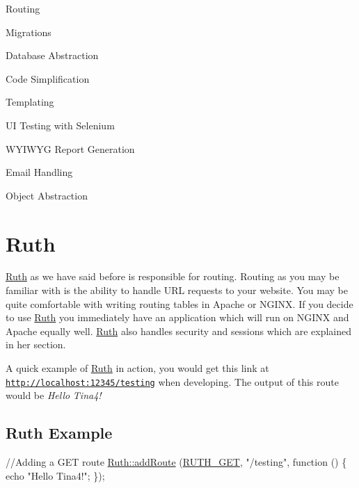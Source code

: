 \begin{DoxyItemize}
\item Routing  
\item Migrations  
\item Database Abstraction  
\item Code Simplification  
\item Templating  
\item U\+I Testing with Selenium  
\item W\+Y\+I\+W\+Y\+G Report Generation  
\item Email Handling  
\item Object Abstraction  
\end{DoxyItemize}\hypertarget{index_ruth}{}\section{Ruth}\label{index_ruth}
\hyperlink{classRuth}{Ruth} as we have said before is responsible for routing. Routing as you may be familiar with is the ability to handle U\+R\+L requests to your website. You may be quite comfortable with writing routing tables in Apache or N\+G\+I\+N\+X. If you decide to use \hyperlink{classRuth}{Ruth} you immediately have an application which will run on N\+G\+I\+N\+X and Apache equally well. \hyperlink{classRuth}{Ruth} also handles security and sessions which are explained in her section.

A quick example of \hyperlink{classRuth}{Ruth} in action, you would get this link at \href{http://localhost:12345/testing}{\tt http\+://localhost\+:12345/testing} when developing. The output of this route would be {\itshape Hello} {\itshape Tina4!} \hypertarget{index_ruth_example}{}\subsection{Ruth Example}\label{index_ruth_example}

\begin{DoxyCode}
\textcolor{comment}{//Adding a GET route}
\hyperlink{classRuth_ad13bc87f60f8b74efd4c784fa2c49288}{Ruth::addRoute} (\hyperlink{Ruth_8php_acc73cd34b6fcffd15a4fdd050e0a86d8}{RUTH\_GET}, \textcolor{stringliteral}{"/testing"}, \textcolor{keyword}{function} () \{
     echo \textcolor{stringliteral}{"Hello Tina4!"};
\});
\end{DoxyCode}


